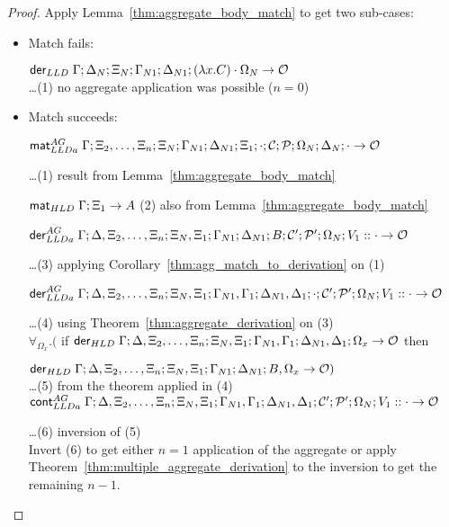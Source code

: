 \begin{proof}
Apply Lemma~\ref{thm:aggregate_body_match} to get two sub-cases:
   
\begin{itemize}[leftmargin=*]
   \item Match fails:
   
   $\mathsf{der}_{LLD} \; \Gamma; \Delta_N; \Xi_N; \Gamma_{N1}; \Delta_{N1}; (\lambda x. C)\cdot \Omega_N
   \rightarrow \mathcal{O}$\\
   \dots \hfill (1) no aggregate application was possible ($n = 0$)\\
   
   \item Match succeeds:
   
   $\mathsf{mat}_{LLDa}^{AG} \; \Gamma; \Xi_2, \dotsc, \Xi_n; \Xi_N; \Gamma_{N1}; \Delta_{N1};
\Xi_1; \cdot; \mathcal{C}; \mathcal{P}; \Omega_N; \Delta_N; \cdot \rightarrow \mathcal{O}$
   
   \dots \hfill (1) result from Lemma~\ref{thm:aggregate_body_match}
   
   $\mathsf{mat}_{HLD} \; \Gamma; \Xi_1 \rightarrow A$
   \hfill (2) also from Lemma~\ref{thm:aggregate_body_match}
   
   $\mathsf{der}_{LLDa}^{AG} \; \Gamma; \Delta, \Xi_2, \dotsc, \Xi_n; \Xi_N, \Xi_1; \Gamma_{N1}; \Delta_{N1}; B; \mathcal{C'};
\mathcal{P'}; \Omega_N; V_1 :: \cdot \rightarrow \mathcal{O}$
   
   \dots \hfill (3) applying Corollary~\ref{thm:agg_match_to_derivation} on (1)
   
   $\mathsf{der}_{LLDa}^{AG} \; \Gamma; \Delta, \Xi_2, \dotsc, \Xi_n; \Xi_N, \Xi_1; \Gamma_{N1}, \Gamma_1; \Delta_{N1}, \Delta_1;
   \cdot; \mathcal{C'}; \mathcal{P'}; \Omega_N; V_1 :: \cdot \rightarrow \mathcal{O}$
   
   \dots \hfill (4) using Theorem~\ref{thm:aggregate_derivation} on (3)\\
   
   $\forall_{\Omega_x}. ($ if $\mathsf{der}_{HLD} \; \Gamma; \Delta, \Xi_2, \dotsc, \Xi_n; \Xi_N,
         \Xi_1; \Gamma_{N1}, \Gamma_1; \Delta_{N1}, \Delta_1; \Omega_x
         \rightarrow \mathcal{O}$ then
   
    \hspace*{0.5cm} $\mathsf{der}_{HLD} \; \Gamma; \Delta, \Xi_2, \dotsc, \Xi_n; \Xi_N, \Xi_1; \Gamma_{N1};
    \Delta_{N1}; B, \Omega_x \rightarrow \mathcal{O})$ \\ \dots \hfill (5)
   from the theorem applied in (4)\\
   
   $\mathsf{cont}_{LLDa}^{AG} \; \Gamma; \Delta, \Xi_2, \dotsc, \Xi_n; \Xi_N, \Xi_1; \Gamma_{N1},
   \Gamma_1; \Delta_{N1}, \Delta_1; \mathcal{C'}; \mathcal{P'}; \Omega_N; V_1 ::
   \cdot \rightarrow \mathcal{O}$
   
   \dots \hfill (6) inversion of (5)\\
   
   Invert (6) to get either $n = 1$ application of the aggregate or apply
   Theorem~\ref{thm:multiple_aggregate_derivation} to the inversion to get the remaining $n-1$. 
\end{itemize}
\end{proof}
